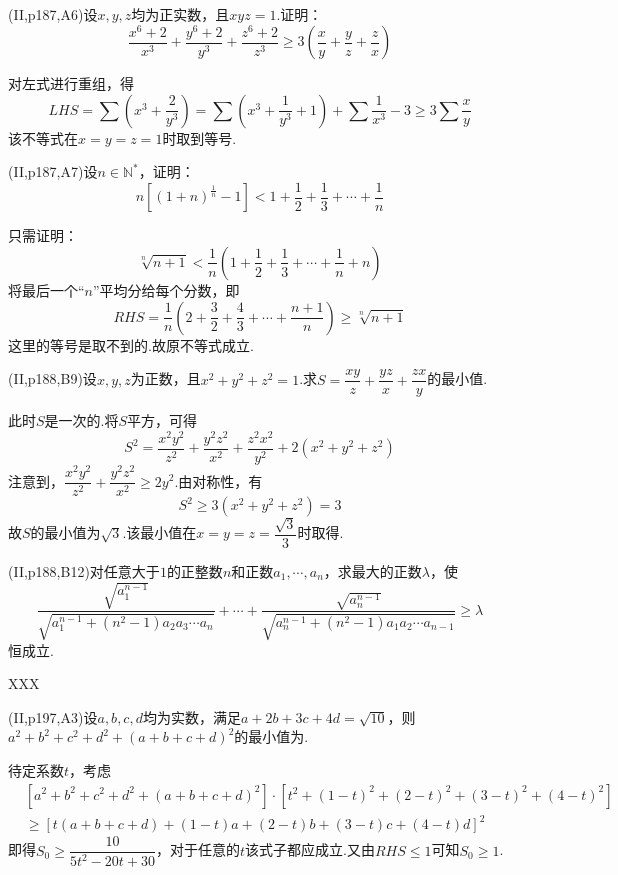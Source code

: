 \documentclass[cn,hazy,black,10pt,normal]{elegantnote}
\newcommand{\tk}{\uline{\hspace{4em}}}
\newcommand{\ssb}[1]{\left( #1 \right)}
\begin{document}
\begin{problem}
	(II,p187,A6)设$x,y,z$均为正实数，且$xyz=1$.证明：$$\frac{x^6+2}{x^3} + \frac{y^6+2}{y^3} + \frac{z^6+2}{z^3} \geq 3\ssb{\frac{x}{y} + \frac{y}{z} + \frac{z}{x}}$$
\end{problem}
\begin{solution}
	对左式进行重组，得$$LHS = \sum \ssb{x^3+\frac{2}{y^3}} = \sum \ssb{ x^3 + \frac{1}{y^3} +1 } + \sum \frac{1}{x^3} -3 \geq 3\sum \frac{x}{y}$$
	该不等式在$x=y=z=1$时取到等号.
\end{solution}

\begin{problem}
	(II,p187,A7)设$n \in \mathbb{N}^*$，证明：$$n[(1+n)^{\frac{1}{n}}-1] < 1 + \frac{1}{2} + \frac{1}{3} + \cdots + \frac{1}{n}$$
\end{problem}
\begin{solution}
	只需证明：$$\sqrt[n]{n+1} < \frac{1}{n} \ssb{ 1 + \frac{1}{2} + \frac{1}{3} + \cdots + \frac{1}{n} + n }$$
	将最后一个“$n$”平均分给每个分数，即$$RHS = \frac{1}{n} \ssb{ 2 + \frac{3}{2} + \frac{4}{3} + \cdots + \frac{n+1}{n} } \geq \sqrt[n]{n+1}$$
	这里的等号是取不到的.故原不等式成立.
\end{solution}

\begin{problem}
	(II,p188,B9)设$x,y,z$为正数，且$x^2+y^2+z^2=1$.求$S=\dfrac{xy}{z} + \dfrac{yz}{x} + \dfrac{zx}{y}$的最小值.
\end{problem}
\begin{solution}
	此时$S$是一次的.将$S$平方，可得$$S^2 = \frac{x^2y^2}{z^2} + \frac{y^2z^2}{x^2} + \frac{z^2x^2}{y^2} + 2(x^2+y^2+z^2)$$
	注意到，$\dfrac{x^2y^2}{z^2} + \dfrac{y^2z^2}{x^2} \geq 2y^2$.由对称性，有$$S^2 \geq 3(x^2+y^2+z^2) = 3$$
	故$S$的最小值为$\sqrt{3}$.该最小值在$x=y=z=\dfrac{\sqrt{3}}{3}$时取得.
\end{solution}

\begin{problem}
	(II,p188,B12)对任意大于$1$的正整数$n$和正数$a_1,\cdots ,a_n$，求最大的正数$\lambda$，使$$\frac{\sqrt{a_1^{n-1}}}{\sqrt{a_1^{n-1} + (n^2-1)a_2a_3 \cdots a_n}} + \cdots + \frac{\sqrt{a_n^{n-1}}}{\sqrt{a_n^{n-1} + (n^2-1)a_1a_2 \cdots a_{n-1}}} \geq \lambda$$恒成立.
\end{problem}
\begin{solution}
	XXX
\end{solution}

\begin{problem}
	(II,p197,A3)设$a,b,c,d$均为实数，满足$a+2b+3c+4d=\sqrt{10}$，则$a^2+b^2+c^2+d^2+(a+b+c+d)^2$的最小值为\tk .
\end{problem}
\begin{solution}
	待定系数$t$，考虑
	\begin{align*}
		&\left[ a^2+b^2+c^2+d^2+(a+b+c+d)^2 \right] \cdot \left[ t^2+(1-t)^2+(2-t)^2+(3-t)^2+(4-t)^2 \right] \\
		&\geq \left[ t(a+b+c+d) + (1-t)a + (2-t)b + (3-t)c + (4-t)d \right]^2
	\end{align*}
	即得$S_0 \geq \dfrac{10}{5t^2-20t+30}$，对于任意的$t$该式子都应成立.又由$RHS \leq 1$可知$S_0 \geq 1$.
\end{solution}
\end{document}
